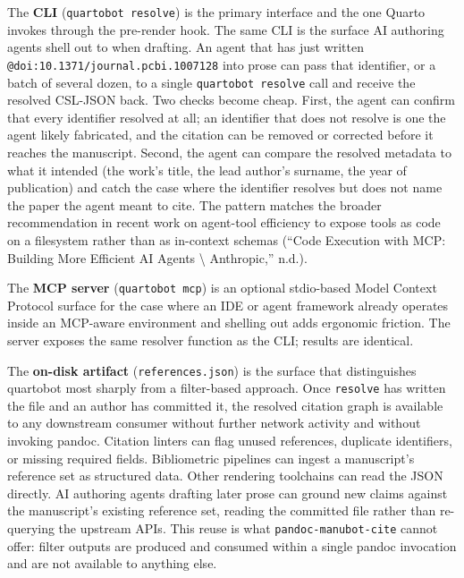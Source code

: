 \documentclass[
  letterpaper,
  DIV=11,
  numbers=noendperiod]{scrartcl}
\begin{document}
The \textbf{CLI} (\texttt{quartobot\ resolve}) is the primary interface
and the one Quarto invokes through the pre-render hook. The same CLI is
the surface AI authoring agents shell out to when drafting. An agent
that has just written \texttt{@doi:10.1371/journal.pcbi.1007128} into
prose can pass that identifier, or a batch of several dozen, to a single
\texttt{quartobot\ resolve} call and receive the resolved CSL-JSON back.
Two checks become cheap. First, the agent can confirm that every
identifier resolved at all; an identifier that does not resolve is one
the agent likely fabricated, and the citation can be removed or
corrected before it reaches the manuscript. Second, the agent can
compare the resolved metadata to what it intended (the work's title, the
lead author's surname, the year of publication) and catch the case where
the identifier resolves but does not name the paper the agent meant to
cite. The pattern matches the broader recommendation in recent work on
agent-tool efficiency to expose tools as code on a filesystem rather
than as in-context schemas ({``Code Execution with {MCP:} Building More
Efficient {AI} Agents \textbackslash{} {Anthropic},''} n.d.).

The \textbf{MCP server} (\texttt{quartobot\ mcp}) is an optional
stdio-based Model Context Protocol surface for the case where an IDE or
agent framework already operates inside an MCP-aware environment and
shelling out adds ergonomic friction. The server exposes the same
resolver function as the CLI; results are identical.

The \textbf{on-disk artifact} (\texttt{references.json}) is the surface
that distinguishes quartobot most sharply from a filter-based approach.
Once \texttt{resolve} has written the file and an author has committed
it, the resolved citation graph is available to any downstream consumer
without further network activity and without invoking pandoc. Citation
linters can flag unused references, duplicate identifiers, or missing
required fields. Bibliometric pipelines can ingest a manuscript's
reference set as structured data. Other rendering toolchains can read
the JSON directly. AI authoring agents drafting later prose can ground
new claims against the manuscript's existing reference set, reading the
committed file rather than re-querying the upstream APIs. This reuse is
what \texttt{pandoc-manubot-cite} cannot offer: filter outputs are
produced and consumed within a single pandoc invocation and are not
available to anything else.
\end{document}
